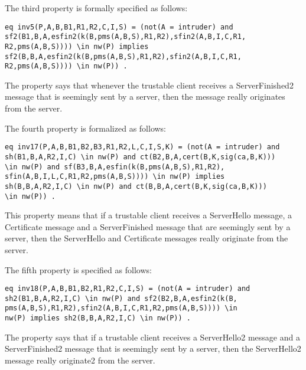 \documentclass[a4paper,fleqn]{cas-dc}
\begin{document}
The third property is formally specified as follows:
\begin{verbatim}
eq inv5(P,A,B,B1,R1,R2,C,I,S) = (not(A = intruder) and
sf2(B1,B,A,esfin2(k(B,pms(A,B,S),R1,R2),sfin2(A,B,I,C,R1,
R2,pms(A,B,S)))) \in nw(P) implies
sf2(B,B,A,esfin2(k(B,pms(A,B,S),R1,R2),sfin2(A,B,I,C,R1,
R2,pms(A,B,S)))) \in nw(P)) .
\end{verbatim}
The property says that whenever the trustable client receives a ServerFinished2 message that is seemingly sent by a server, then the message really originates from the server.  

The fourth property is formalized as follows:
\begin{small}
\begin{verbatim}
eq inv17(P,A,B,B1,B2,B3,R1,R2,L,C,I,S,K) = (not(A = intruder) and
sh(B1,B,A,R2,I,C) \in nw(P) and ct(B2,B,A,cert(B,K,sig(ca,B,K)))
\in nw(P) and sf(B3,B,A,esfin(k(B,pms(A,B,S),R1,R2),
sfin(A,B,I,L,C,R1,R2,pms(A,B,S)))) \in nw(P) implies
sh(B,B,A,R2,I,C) \in nw(P) and ct(B,B,A,cert(B,K,sig(ca,B,K))) 
\in nw(P)) .
\end{verbatim}
\end{small}
This property means that if a trustable client receives a ServerHello message, a Certificate message and a ServerFinished message that are seemingly sent by a server, then the ServerHello and Certificate messages really originate from the server.

The fifth property is specified as follows:
\begin{verbatim}
eq inv18(P,A,B,B1,B2,R1,R2,C,I,S) = (not(A = intruder) and 
sh2(B1,B,A,R2,I,C) \in nw(P) and sf2(B2,B,A,esfin2(k(B,
pms(A,B,S),R1,R2),sfin2(A,B,I,C,R1,R2,pms(A,B,S)))) \in 
nw(P) implies sh2(B,B,A,R2,I,C) \in nw(P)) .
\end{verbatim}
The property says that if a trustable client receives a ServerHello2 message and
a ServerFinished2 message that is seemingly sent by a server, then the ServerHello2
message really originate2 from the server.

\end{document}
